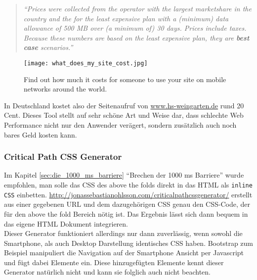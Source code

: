 			\begin{quote}
				\textit{"`Prices were collected from the operator with the largest marketshare in the country and the for the least expensive plan with a (minimum) data allowance of 500 MB over (a minimum of) 30 days. Prices include taxes. Because these numbers are based on the least expensive plan, they are \textbf{best case} scenarios."'}\autocite{siteCosts}
			\end{quote}

		\begin{figure}[htbp]
			\begin{center}
				\texttt{[image: what\_does\_my\_site\_cost.jpg]}
				\caption{Find out how much it costs for someone to use your site on mobile networks around the world.\autocite{siteCosts}}
				\label{fig:what_does_my_site_cost}
			\end{center}
		\end{figure}

		In Deutschland kostet also der Seitenaufruf von \url{www.hs-weingarten.de} rund 20 Cent. Dieses Tool stellt auf sehr schöne Art und Weise dar, dass schlechte Web Performance nicht nur den Anwender verägert, sondern zusätzlich auch noch bares Geld kosten kann.

		\subsubsection{Critical Path CSS Generator} %
		\label{ssub:critical_path_css_generator}
			Im Kapitel \ref{sec:die_1000_ms_barriere} "`Brechen der 1000 ms Barriere"' wurde empfohlen, man solle das CSS des above the folds direkt in das HTML als \texttt{inline CSS} einbetten. \url{http://jonassebastianohlsson.com/criticalpathcssgenerator/} erstellt aus einer gegebenen URL und dem dazugehörigen CSS genau den CSS-Code, der für den above the fold Bereich nötig ist. Das Ergebnis lässt sich dann bequem in das eigene HTML Dokument integrieren.\\

			Dieser Generator funktioniert allerdings nur dann zuverlässig, wenn sowohl die Smartphone, als auch Desktop Darstellung identisches CSS haben. Bootstrap zum Beispiel manipuliert die Navigation auf der Smartphone Ansicht per Javascript und fügt dabei Elemente ein. Diese hinzugefügten Elemente kennt dieser Generator natürlich nicht und kann sie folglich auch nicht beachten.


